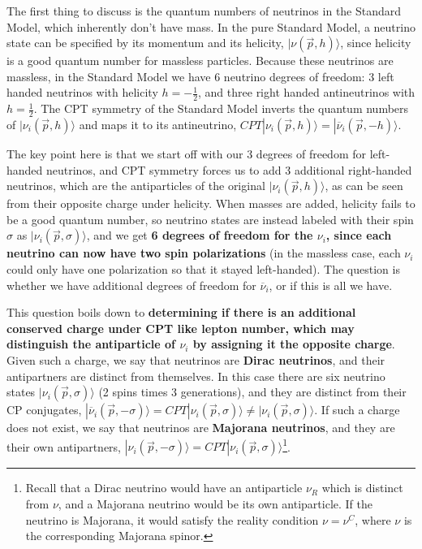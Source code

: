 \documentclass[11pt, oneside]{article}   	%
\theoremstyle{definition}
\numberwithin{equation}{subsection}		%
\begin{document}
The first thing to discuss is the quantum numbers of neutrinos in the Standard Model, which inherently don't have mass. In the pure Standard 
Model, a neutrino state can be specified by its momentum and its helicity, $|\nu(\vec p, h)\rangle$, since helicity is a good quantum number 
for massless particles. Because these neutrinos are massless, in the Standard Model we have 6 neutrino degrees of freedom: 3 left handed 
neutrinos with helicity $h = -\frac{1}{2}$, and three right handed antineutrinos with $h = \frac{1}{2}$. The CPT symmetry of the Standard Model 
inverts the quantum numbers of $|\nu_i(\vec p, h)\rangle$ and maps it to its antineutrino, $CPT|\nu_i(\vec p, h)\rangle = |\overline\nu_i(\vec p, -h)\rangle$. 

The key point here is that we start off with our 3 degrees of freedom for left-handed neutrinos, and CPT symmetry forces us to add 3 additional 
right-handed neutrinos, which are the antiparticles of the original $|\nu_i(\vec p, h)\rangle$, as can be seen from their opposite charge under helicity. 
When masses are added, helicity fails to be a good quantum number, so neutrino states are instead labeled with their spin $\sigma$ as 
$|\nu_i(\vec p, \sigma)\rangle$, and we get \textbf{6 degrees of freedom for the $\nu_i$, since each neutrino can now have two spin polarizations} (in the 
massless case, each $\nu_i$ could only have one polarization so that it stayed left-handed). The question is whether we have additional 
degrees of freedom for $\overline\nu_i$, or if this is all we have. 

This question boils down to \textbf{determining if there is an additional conserved charge 
under CPT like lepton number, which may distinguish the antiparticle of $\nu_i$ by assigning it the opposite charge}. Given such a charge, 
we say that neutrinos are \textbf{Dirac neutrinos}, and their antipartners are distinct from themselves. In this case there are six neutrino 
states $|\nu_i(\vec p, \sigma)\rangle$ (2 spins times 3 generations), and they are distinct from their CP conjugates, 
$|\overline\nu_i(\vec p, -\sigma)\rangle = CPT |\nu_i(\vec p, \sigma)\rangle\neq |\nu_i(\vec p, \sigma)\rangle$. If such a charge does not exist, 
we say that neutrinos are \textbf{Majorana neutrinos}, and they are their own antipartners, 
$|\nu_i(\vec p, -\sigma)\rangle = CPT |\nu_i(\vec p, \sigma)\rangle$\footnote{Recall that 
a Dirac neutrino would have an antiparticle $\nu_R$ which is distinct from $\nu$, and a Majorana neutrino would be its own antiparticle. 
If the neutrino is Majorana, it would satisfy the reality condition $\nu = \nu^C$, where $\nu$ is the corresponding Majorana spinor.}.
\end{document}

